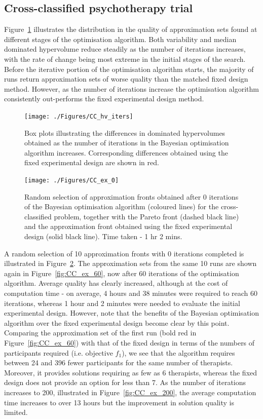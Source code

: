 \documentclass{article} %
\begin{document}
\subsection{Cross-classified psychotherapy trial}

Figure~\ref{fig:CC_hv_iters} illustrates the distribution in the quality of approximation sets found at different stages of the optimisation algorithm. Both variability and median dominated hypervolume reduce steadily as the number of iterations increases, with the rate of change being most extreme in the initial stages of the search. Before the iterative portion of the optimisation algorithm starts, the majority of runs return approximation sets of worse quality than the matched fixed design method. However, as the number of iterations increase the optimisation algorithm consistently out-performs the fixed experimental design method. 

\begin{figure}
\centering
\texttt{[image: ./Figures/CC\_hv\_iters]}
\caption{Box plots illustrating the differences in dominated hypervolumes obtained as the number of iterations in the Bayesian optimisation algorithm increases. Corresponding differences obtained using the fixed experimental design are shown in red.}
\label{fig:CC_hv_iters}
\end{figure}

\begin{figure}
\centering
\texttt{[image: ./Figures/CC\_ex\_0]}
\caption{Random selection of approximation fronts obtained after 0 iterations of the Bayesian optimisation algorithm (coloured lines) for the cross-classified problem, together with the Pareto front (dashed black line) and the approximation front obtained using the fixed experimental design (solid black line). Time taken - 1 hr 2 mins.}
\label{fig:CC_ex_0}
\end{figure}

A random selection of 10 approximation fronts with 0 iterations completed is illustrated in Figure~\ref{fig:CC_ex_0}. The approximation sets from the same 10 runs are shown again in Figure~\ref{fig:CC_ex_60}, now after 60 iterations of the optimisation algorithm. Average quality has clearly increased, although at the cost of computation time - on average, 4 hours and 38 minutes were required to reach 60 iterations, whereas 1 hour and 2 minutes were needed to evaluate the initial experimental design. However, note that the benefits of the Bayesian optimisation algorithm over the fixed experimental design become clear by this point. Comparing the approximation set of the first run (bold red in Figure~\ref{fig:CC_ex_60}) with that of the fixed design in terms of the numbers of participants required (i.e. objective $f_{1}$), we see that the algorithm requires between 24 and 396 fewer participants for the same number of therapists. Moreover, it provides solutions requiring as few as 6 therapists, whereas the fixed design does not provide an option for less than 7. As the number of iterations increases to 200, illustrated in Figure~\ref{fig:CC_ex_200}, the average computation time increases to over 13 hours but the improvement in solution quality is limited.
\end{document}
